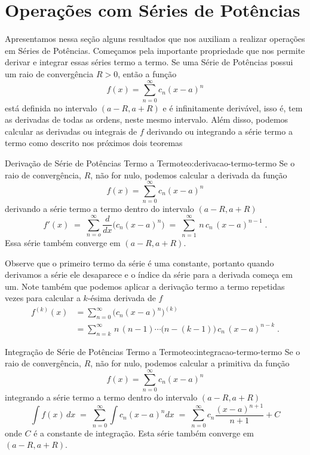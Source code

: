 \section{Operações com Séries de Potências}

Apresentamos nessa seção alguns resultados que nos auxiliam a realizar operações
em Séries de Potências. Começamos pela importante propriedade que nos permite
derivar e integrar essas séries termo a termo.
Se uma Série de Potências possui um raio de convergência $R>0$, então a função
\[
  f(x)=\sum_{n=0}^\infty c_n(x-a)^n
\]
está definida no intervalo $(a-R, a+R)$ e é infinitamente derivável, isso é,
tem as derivadas de todas as ordens, neste mesmo intervalo.
Além disso, podemos calcular as derivadas ou integrais de $f$
derivando ou integrando a série termo a termo como descrito nos próximos
dois teoremas

\begin{teorema}{Derivação de Série de Potências Termo a Termo}{teo:derivacao-termo-termo}
  Se o raio de convergência, $R$, não for nulo, podemos calcular a derivada da função
  \[
    f(x) = \sum_{n=0}^\infty c_n(x-a)^n
  \]
  derivando a série termo a termo dentro do intervalo $(a-R, a+R)$
  \[
    f'(x) \;=\; \sum_{n=o}^\infty \frac{d}{dx}\big( c_n(x-a)^n \big)
          \;=\; \sum_{n=1}^\infty \,n\,c_n\,(x-a)^{n-1}   \;.
  \]
  Essa série também converge em $(a-R, a+R)$.
\end{teorema}

Observe que o primeiro termo da série é uma constante, portanto quando
derivamos a série ele desaparece e o índice da série para a derivada começa em um.
Note também que podemos aplicar a derivação termo a termo repetidas vezes
para calcular a $k$-ésima derivada de $f$
\begin{align*}
  f^{(k)}(x) & = \sum_{n=0}^\infty \big( c_n(x-a)^n \big)^{(k)}                          \\[3mm]
             & = \sum_{n=k}^\infty \,n\,(n-1) \cdots \big(n-(k-1)\big)\,c_n\,(x-a)^{n-k} \;.
\end{align*}

\begin{teorema}{Integração de Série de Potências Termo a Termo}{teo:integracao-termo-termo}
  Se o raio de convergência, $R$, não for nulo, podemos calcular a primitiva da função
  \[
    f(x) = \sum_{n=0}^\infty c_n(x-a)^n
  \]
  integrando a série termo a termo dentro do intervalo $(a-R, a+R)$
  \[
    \int f(x)\,dx \;=\; \sum_{n=0}^\infty \int c_n(x-a)^n dx
                  \;=\; \sum_{n=0}^\infty c_n\frac{(x-a)^{n+1}}{n+1}+ C
  \]
  onde $C$ é a constante de integração. Esta série também converge em $(a-R, a+R)$.
\end{teorema}

